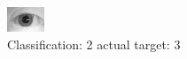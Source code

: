 \begin{figure}[h!]
\begin{center}
\includegraphics[width=0.60\columnwidth]{figures/ID1048_class_2_target_3.png}
\end{center}
\caption{ Classification: 2 actual target: 3}
\label{fig:ID1048_class_2_target_3}
\end{figure}
